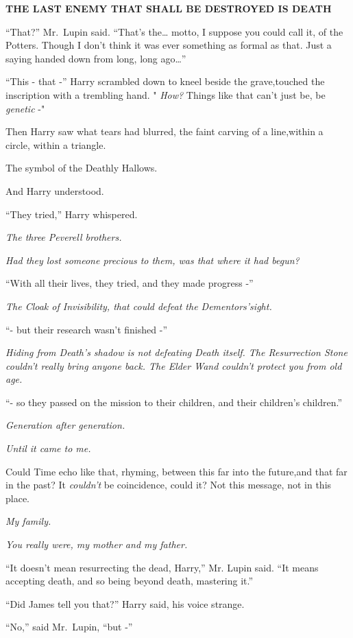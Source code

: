 \textbf{THE LAST ENEMY THAT SHALL BE DESTROYED IS DEATH}

``That?'' Mr.~Lupin said. ``That's the\ldots{} motto, I suppose you could call it, of the Potters. Though I don't think it was ever something as formal as that. Just a saying handed down from long, long ago\ldots{}''

``This - that -'' Harry scrambled down to kneel beside the grave,touched the inscription with a trembling hand. " \emph{How?} Things like that can't just be, be \emph{genetic} -"

Then Harry saw what tears had blurred, the faint carving of a line,within a circle, within a triangle.

The symbol of the Deathly Hallows.

And Harry understood.

``They tried,'' Harry whispered.

\emph{The three Peverell brothers.}

\emph{Had they lost someone precious to them, was that where it had begun?}

``With all their lives, they tried, and they made progress -''

\emph{The Cloak of Invisibility, that could defeat the Dementors'sight.}

``- but their research wasn't finished -''

\emph{Hiding from Death's shadow is not defeating Death itself. The Resurrection Stone couldn't really bring anyone back. The Elder Wand couldn't protect you from old age.}

``- so they passed on the mission to their children, and their children's children.''

\emph{Generation after generation.}

\emph{Until it came to me.}

Could Time echo like that, rhyming, between this far into the future,and that far in the past? It \emph{couldn't} be coincidence, could it? Not this message, not in this place.

\emph{My family.}

\emph{You really were, my mother and my father.}

``It doesn't mean resurrecting the dead, Harry,'' Mr. Lupin said. ``It means accepting death, and so being beyond death, mastering it.''

``Did James tell you that?'' Harry said, his voice strange.

``No,'' said Mr.~Lupin, ``but -''

